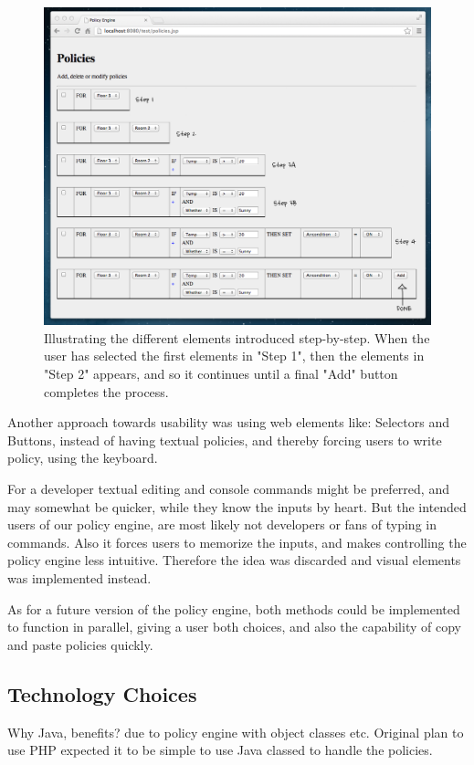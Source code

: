 \begin{figure}[h!]
\centering
\includegraphics[width=\columnwidth]{building_policy_steps.png}
\caption{Illustrating the different elements introduced step-by-step. When the user has selected the first elements in "Step 1", then the elements in "Step 2" appears, and so it continues until a final "Add" button completes the process.}
\label{fig:building_policy_steps}
\end{figure}

Another approach towards usability was using web elements like: Selectors and Buttons, instead of having textual policies, and thereby forcing users to write policy, using the keyboard.

For a developer textual editing and console commands might be preferred, and may somewhat be quicker, while they know the inputs by heart. But the intended users of our policy engine, are most likely not developers or fans of typing in commands.
Also it forces users to memorize the inputs, and makes controlling the policy engine less intuitive. Therefore the idea was discarded and visual elements was implemented instead.

As for a future version of the policy engine, both methods could be implemented to function in parallel, giving a user both choices, and also the capability of copy and paste policies quickly.


\subsection{Technology Choices}
Why Java, benefits? due to policy engine with object classes etc. Original plan to use PHP expected it to be simple to use Java classed to handle the policies.
